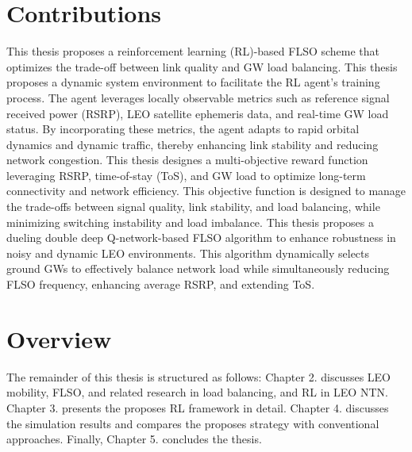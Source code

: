 \section{Contributions} \quad This thesis proposes a reinforcement learning (RL)-based FLSO scheme that optimizes the trade-off between link quality and GW load balancing. %
This thesis proposes a dynamic system environment to facilitate the RL agent's training process. The agent leverages locally observable metrics such as reference signal received power (RSRP), LEO satellite ephemeris data, and real-time GW load status. By incorporating these metrics, the agent adapts to rapid orbital dynamics and dynamic traffic, thereby enhancing link stability and reducing network congestion. 
This thesis designes a multi-objective reward function leveraging RSRP, time-of-stay (ToS), and GW load to optimize long-term connectivity and network efficiency. 
This objective function is designed to manage the trade-offs between signal quality, link stability, and load balancing, while minimizing switching instability and load imbalance. 
This thesis proposes a dueling double deep Q-network-based FLSO algorithm to enhance robustness in noisy and dynamic LEO environments. This algorithm dynamically selects ground GWs to effectively balance network load while simultaneously reducing FLSO frequency, enhancing average RSRP, and extending ToS.

\section{Overview} \quad The remainder of this thesis is structured as follows: %
Chapter 2. discusses LEO mobility, FLSO, and related research in load balancing, and RL in LEO NTN. %
Chapter 3. presents the proposes RL framework in detail. %
Chapter 4. discusses the simulation results and compares the proposes strategy with conventional approaches. Finally, %
Chapter 5. concludes the thesis. %